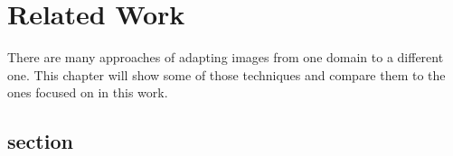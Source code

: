 \chapter{Related Work}
\label{sec:related_work}

There are many approaches of adapting images from one domain to a different one. This chapter will show some of those techniques and compare them to the ones focused on in this work.

\section{section}